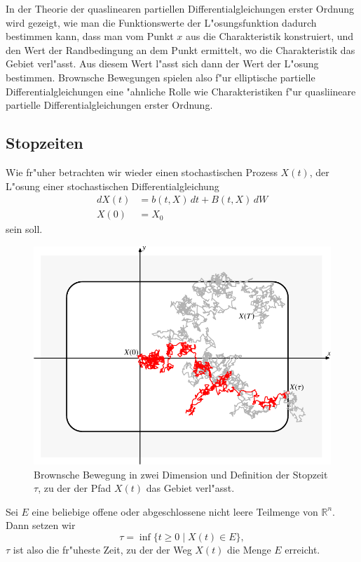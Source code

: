 In der Theorie der quaslinearen partiellen Differentialgleichungen erster
Ordnung wird gezeigt, wie man die Funktionswerte der L"osungsfunktion
dadurch bestimmen kann, dass man vom Punkt $x$ aus die Charakteristik 
konstruiert, und den Wert der Randbedingung an dem Punkt ermittelt,
wo die Charakteristik das Gebiet verl"asst.
Aus diesem Wert l"asst sich dann der Wert der L"osung bestimmen.
Brownsche Bewegungen spielen also f"ur elliptische partielle
Differentialgleichungen eine "ahnliche Rolle wie Charakteristiken f"ur
quasliineare partielle Differentialgleichungen erster Ordnung.

\subsection{Stopzeiten}
Wie fr"uher betrachten wir wieder einen stochastischen Prozess $X(t)$,
der L"osung einer stochastischen Differentialgleichung
\begin{equation}
\begin{aligned}
dX(t)&=b(t,X)\,dt + B(t,X)\,dW
\\
X(0)&=X_0
\end{aligned}
\label{stochastisch:stopzeitdgl}
\end{equation}
sein soll.
\begin{figure}
\centering
\includegraphics{chapters/images/stochastisch-2.pdf}
\caption{Brownsche Bewegung in zwei Dimension und Definition der
Stopzeit $\tau$, zu der der Pfad $X(t)$ das Gebiet verl"asst.
\label{stochastisch:pfad}}
\end{figure}

\begin{definition}
Sei $E$ eine beliebige offene oder abgeschlossene nicht leere Teilmenge
von $\mathbb R^n$.
Dann setzen wir
\[
\tau = \inf\{t\ge 0\;|\;X(t)\in E\},
\]
$\tau$ ist also die fr"uheste Zeit, zu der der Weg $X(t)$ die Menge $E$
erreicht.
\end{definition}

